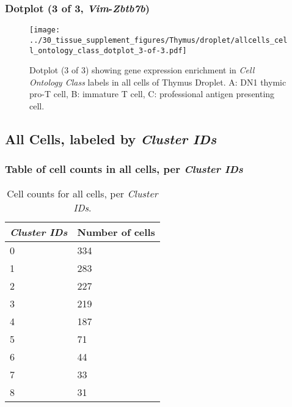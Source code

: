 \clearpage

\subsubsection{Dotplot (3 of 3, \emph{Vim}-\emph{Zbtb7b})}
\begin{figure}[h]
\centering
\texttt{[image: ../30\_tissue\_supplement\_figures/Thymus/droplet/allcells\_cell\_ontology\_class\_dotplot\_3-of-3.pdf]}

\caption{ Dotplot (3 of 3)  showing gene expression enrichment in \emph{Cell Ontology Class} labels in all cells of Thymus Droplet. A: DN1 thymic pro-T cell, B: immature T cell, C: professional antigen presenting cell.}
\end{figure}


\clearpage

\subsection{All Cells, labeled by \emph{Cluster IDs}}
\subsubsection{Table of cell counts in all cells, per \emph{Cluster IDs}}\begin{table}[h]
\centering
\label{my-label}
\begin{tabular}{@{}ll@{}}
\toprule

\emph{Cluster IDs}& Number of cells \\ \midrule
0 & 334 \\

1 & 283 \\

2 & 227 \\

3 & 219 \\

4 & 187 \\

5 & 71 \\

6 & 44 \\

7 & 33 \\

8 & 31 \\
\bottomrule
\end{tabular}
\caption{Cell counts for all cells, per \emph{Cluster IDs}.}
\end{table}

